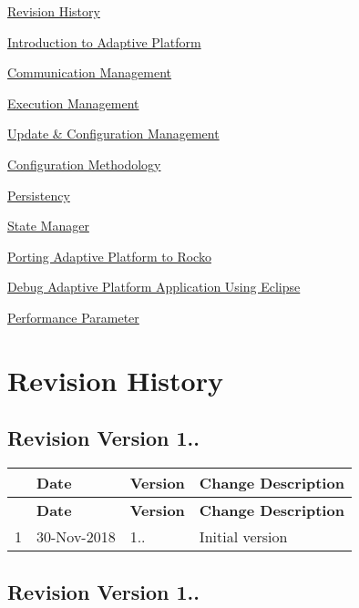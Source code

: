 
\begin{DoxyItemize}
\item \hyperlink{revision_history}{Revision History}
\item \hyperlink{adaptive_platform_introduction}{Introduction to Adaptive Platform}
\item \hyperlink{adaptive_communicationmanagement}{Communication Management}
\item \hyperlink{adaptive_executionmanagement}{Execution Management}
\item \hyperlink{adaptive_update_configurationmanagement}{Update \& Configuration Management}
\item \hyperlink{adaptive_configurationmethodology}{Configuration Methodology}
\item \hyperlink{adaptive_persistency}{Persistency}
\item \hyperlink{adaptive_state_manager}{State Manager}
\item \hyperlink{Porting_rocko}{Porting Adaptive Platform to Rocko}
\item \hyperlink{Debug_App}{Debug Adaptive Platform Application Using Eclipse}
\item \hyperlink{Performance_parameter}{Performance Parameter} 
\end{DoxyItemize}\hypertarget{revision_history}{}\section{Revision History}\label{revision_history}
\subsection*{Revision Version 1..}

\tabulinesep=1mm
\begin{longtabu} spread 0pt [c]{*4{|X[-1]}|}
\hline
{}&{\bf Date }&{\bf Version }&{\bf Change Description  }\\
\endfirsthead
\hline
\endfoot
\hline
{}&{\bf Date }&{\bf Version }&{\bf Change Description  }\\
 &30-\/\+Nov-\/2018 &1.. &Initial version \\
\end{longtabu}
\subsection*{Revision Version 1..}

